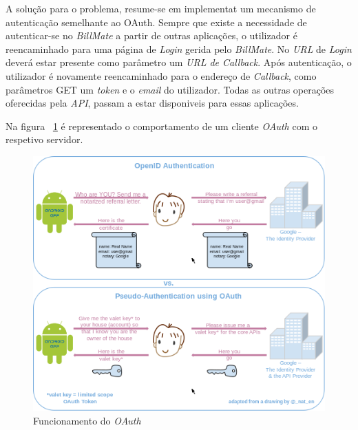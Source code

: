 A solução para o problema, resume-se em implementat um mecanismo de autenticação semelhante ao OAuth. Sempre que existe a necessidade de autenticar-se no \emph{BillMate} a partir de outras aplicações, o utilizador é reencaminhado para uma página de \emph{Login} gerida pelo \emph{BillMate}. No \emph{URL} de \emph{Login} deverá estar presente como parâmetro um \emph{URL de Callback}. Após autenticação, o utilizador é novamente reencaminhado para o endereço de \emph{Callback}, como parâmetros GET um  \emph{token} e o \emph{email} do utilizador. Todas as outras operações oferecidas pela \emph{API}, passam a estar disponiveis para essas aplicações.

Na figura ~\ref{fig:oauth} é representado o comportamento de um cliente \emph{OAuth} com o respetivo servidor.

\begin{figure}[H]
	\centering
	\includegraphics[width=.8\textwidth]{images/oauth}
	\caption{Funcionamento do \emph{OAuth}}
	\label{fig:oauth}
\end{figure}

